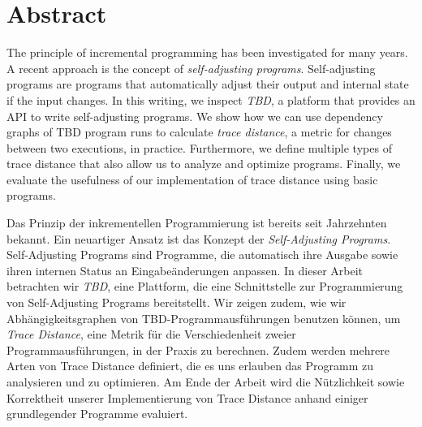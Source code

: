 \documentclass{thesisclass}
\begin{document}
\chapter*{Abstract}
The principle of incremental programming has been investigated for many years. A recent approach is the concept of \textit{self-adjusting programs}. Self-adjusting programs are programs that automatically adjust their output and internal state if the input changes. In this writing, we inspect \textit{TBD}, a platform that provides an API to write self-adjusting programs. We show how we can use dependency graphs of TBD program runs to calculate \textit{trace distance}, a metric for changes between two executions, in practice. Furthermore, we define multiple types of trace distance that also allow us to analyze and optimize programs. Finally, we evaluate the usefulness of our implementation of trace distance using basic programs. 

\vspace{10 mm}

Das Prinzip der inkrementellen Programmierung ist bereits seit Jahrzehnten bekannt. Ein neuartiger Ansatz ist das Konzept der \textit{Self-Adjusting Programs}. Self-Adjusting Programs sind Programme, die automatisch ihre Ausgabe sowie ihren internen Status an Eingabe\"anderungen anpassen. In dieser Arbeit betrachten wir \textit{TBD}, eine Plattform, die eine Schnittstelle zur Programmierung von Self-Adjusting Programs bereitstellt. Wir zeigen zudem, wie wir Abh\"angigkeitsgraphen von TBD-Programmausf\"uhrungen benutzen k\"onnen, um \textit{Trace Distance}, eine Metrik f\"ur die Verschiedenheit zweier Programmausf\"uhrungen, in der Praxis zu berechnen. Zudem werden mehrere Arten von Trace Distance definiert, die es uns erlauben das Programm zu analysieren und zu optimieren. Am Ende der Arbeit wird die N\"utzlichkeit sowie Korrektheit unserer Implementierung von Trace Distance anhand einiger grundlegender Programme evaluiert. 


\tableofcontents
\blankpage


\mainmatter
{}




\cleardoublepage
{}
{}

{}	%
{}	%
												  




\cleardoublepage


\end{document}

